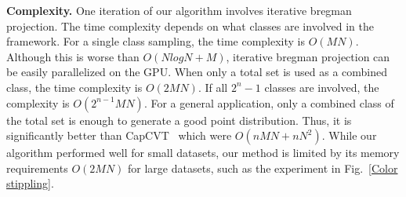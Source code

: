 \textbf{Complexity.}
One iteration of our algorithm involves iterative bregman projection.
The time complexity depends on what classes are involved in the framework.
For a single class sampling,
the time complexity is $O(MN)$.
Although this is worse than $O(NlogN+M)$,
iterative bregman projection can be easily parallelized on the GPU.
When only a total set is used as a combined class,
the time complexity is $O(2MN)$.
If all $2^n-1$ classes are involved,
the complexity is $O(2^{n-1}MN)$.
For a general application,
only a combined class of the total set is enough to generate a good point distribution.
Thus, it is significantly better than CapCVT~\cite{chen:2012:variational} which were $O(nMN+nN^2)$.
While our algorithm performed well for small datasets,
our method is limited by its memory requirements $O(2MN)$ for large datasets, such as the experiment in Fig.~\ref{Color stippling}.


